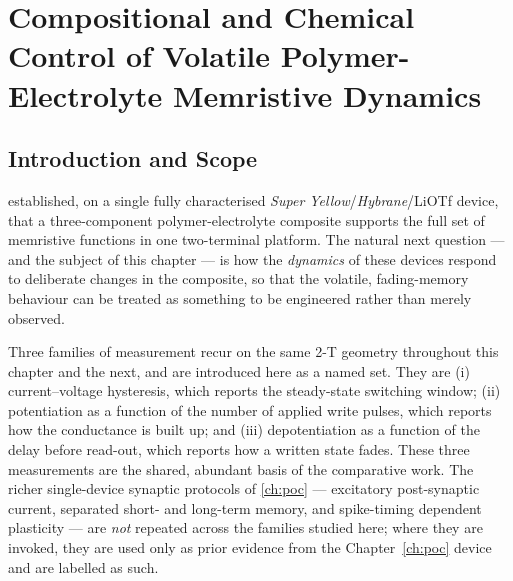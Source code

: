 \documentclass[12pt, twoside]{report}
\begin{document}
  \setcounter{chapter}{2}     %
\fi

\providecommand{\SY}{\textit{Super Yellow}}
\providecommand{\Hybrane}{\textit{Hybrane}}
\providecommand{\PEO}{PEO}
\providecommand{\TMPE}{TMPE}
\providecommand{\LiTf}{LiOTf}
\providecommand{\NaTf}{NaOTf}
\providecommand{\KTf}{KOTf}
\providecommand{\TFSI}{TFSI}
\providecommand{\ITO}{ITO}
\providecommand{\twoterminal}{two-terminal}
\providecommand{\figplaceholder}[2]{%
  \setlength{\fboxsep}{0pt}%
  \fbox{\parbox[c][#1][c]{0.85\linewidth}{%
    \centering\itshape [Figure placeholder]\\[2pt]
    #2\\[2pt]
    \footnotesize\upshape to be generated from data --- see
    \texttt{handouts/10\_chapter3\_comparative\_plan.md}%
  }}%
}

\chapter{Compositional and Chemical Control of Volatile Polymer-Electrolyte Memristive Dynamics}\label{ch:comparative}

\section{Introduction and Scope}\label{sec:ch3_intro}

 established, on a single fully characterised \SY{}/\Hybrane{}/\LiTf{} device, that a three-component polymer-electrolyte composite supports the full set of memristive functions in one \twoterminal{} platform. The natural next question --- and the subject of this chapter --- is how the \emph{dynamics} of these devices respond to deliberate changes in the composite, so that the volatile, fading-memory behaviour can be treated as something to be engineered rather than merely observed.

Three families of measurement recur on the same 2-T geometry throughout this chapter and the next, and are introduced here as a named set. They are (i) current--voltage hysteresis, which reports the steady-state switching window; (ii) potentiation as a function of the number of applied write pulses, which reports how the conductance is built up; and (iii) depotentiation as a function of the delay before read-out, which reports how a written state fades. These three measurements are the shared, abundant basis of the comparative work. The richer single-device synaptic protocols of \cref{ch:poc} --- excitatory post-synaptic current, separated short- and long-term memory, and spike-timing dependent plasticity --- are \emph{not} repeated across the families studied here; where they are invoked, they are used only as prior evidence from the Chapter~\ref{ch:poc} device and are labelled as such.
\end{document}
